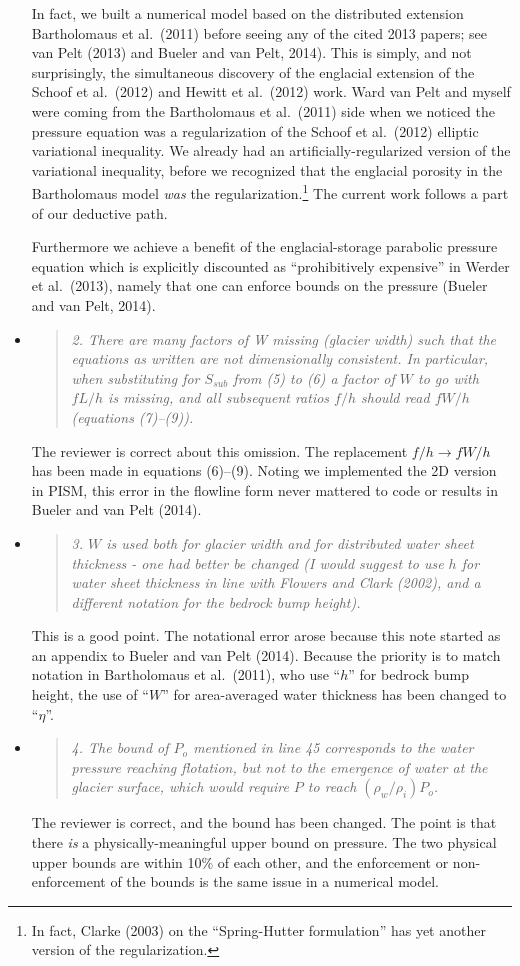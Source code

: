 \documentclass[11pt,reqno]{amsart}
\newcommand{\reply}[2]{
\medskip\medskip
\item  \begin{quote}
\emph{#1}
\end{quote}

\medskip
\noindent #2}
\begin{document}
\begin{itemize}
{In fact, we built a numerical model based on the distributed extension Bartholomaus et al.~(2011) before seeing any of the cited 2013 papers; see van Pelt (2013) and Bueler and van Pelt, 2014).  This is simply, and not surprisingly, the simultaneous discovery of the englacial extension of the Schoof et al.~(2012) and Hewitt et al.~(2012) work.  Ward van Pelt and myself were coming from the Bartholomaus et al.~(2011) side when we noticed the pressure equation was a regularization of the Schoof et al.~(2012) elliptic variational inequality.  We already had an artificially-regularized version of the variational inequality, before we recognized that the englacial porosity in the Bartholomaus model \emph{was} the regularization.\footnote{In fact, Clarke (2003) on the ``Spring-Hutter formulation'' has yet another version of the regularization.}  The current work follows a part of our deductive path.

Furthermore we achieve a benefit of the englacial-storage parabolic pressure equation which is explicitly discounted as ``prohibitively expensive'' in Werder et al.~(2013), namely that one can enforce bounds on the pressure (Bueler and van Pelt, 2014).}

\reply{2. There are many factors of W missing (glacier width) such that the equations as written are not dimensionally consistent. In particular, when substituting for $S_{sub}$ from (5) to (6) a factor of $W$ to go with $f L/h$ is missing, and all subsequent ratios $f /h$ should read $f W/h$ (equations (7)--(9)).}
{The reviewer is correct about this omission.  The replacement $f/h \to fW/h$ has been made in equations (6)--(9).  Noting we implemented the 2D version in PISM, this error in the flowline form never mattered to code or results in Bueler and van Pelt (2014).}

\reply{3. $W$ is used both for glacier width and for distributed water sheet thickness - one had better be changed (I would suggest to use $h$ for water sheet thickness in line with Flowers and Clark (2002), and a different notation for the bedrock bump height).}
{This is a good point.  The notational error arose because this note started as an appendix to Bueler and van Pelt (2014).  Because the priority is to match notation in Bartholomaus et al.~(2011), who use ``$h$'' for bedrock bump height, the use of ``$W$'' for area-averaged water thickness has been changed to ``$\eta$''.}

\reply{4. The bound of $P_o$ mentioned in line 45 corresponds to the water pressure reaching flotation, but not to the emergence of water at the glacier surface, which would require $P$ to reach $(\rho_w/\rho_i) P_o$.}
{The reviewer is correct, and the bound has been changed.  The point is that there \emph{is} a physically-meaningful upper bound on pressure.  The two physical upper bounds are within 10\% of each other, and the enforcement or non-enforcement of the bounds is the same issue in a numerical model.}


\end{itemize}
\end{document}
